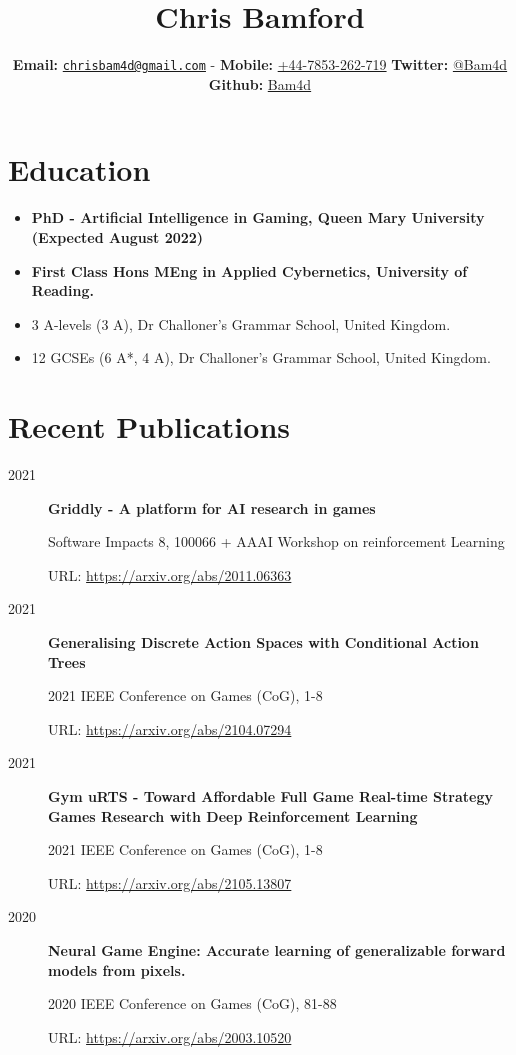 \documentclass[a4paper]{article}
\title{\bfseries\Huge Chris Bamford}
\author{\textbf{Email:}
\href{mailto:chrisbam4d@gmail.com}{\nolinkurl{chrisbam4d@gmail.com}} -
\textbf{Mobile:} \href{tel:+447853262719}{+44-7853-262-719}
\textbf{Twitter:} \href{https://twitter.com/bam4d}{@Bam4d}
\textbf{Github:} \href{https://github.com/Bam4d}{Bam4d}}
\def\tightlist{}
\begin{document}
\maketitle

\section{Education}\label{education}

\begin{itemize}
\tightlist
\item 
  \textbf{PhD - Artificial Intelligence in Gaming, Queen Mary University (Expected August 2022)}
\item
  \textbf{First Class Hons MEng in Applied Cybernetics, University of
  Reading.}
\item
  3 A-levels (3 A), Dr Challoner's Grammar School, United Kingdom.
\item
  12 GCSEs (6 A*, 4 A), Dr Challoner's Grammar School, United Kingdom.
\end{itemize}

\section{Recent Publications}\label{publications}

\begin{description}
\tightlist
\item[2021]
\textbf{Griddly - A platform for AI research in games}

Software Impacts 8, 100066 + AAAI Workshop on reinforcement Learning

URL: \url{https://arxiv.org/abs/2011.06363}
\item[2021]
\textbf{Generalising Discrete Action Spaces with Conditional Action Trees}

2021 IEEE Conference on Games (CoG), 1-8

URL: \url{https://arxiv.org/abs/2104.07294}
\item[2021]
\textbf{Gym uRTS - Toward Affordable Full Game Real-time Strategy Games Research with Deep Reinforcement Learning}

2021 IEEE Conference on Games (CoG), 1-8

URL: \url{https://arxiv.org/abs/2105.13807}
\item[2020]
\textbf{Neural Game Engine: Accurate learning of generalizable forward models from pixels.}

2020 IEEE Conference on Games (CoG), 81-88

URL: \url{https://arxiv.org/abs/2003.10520}
\end{description}
\end{document}
